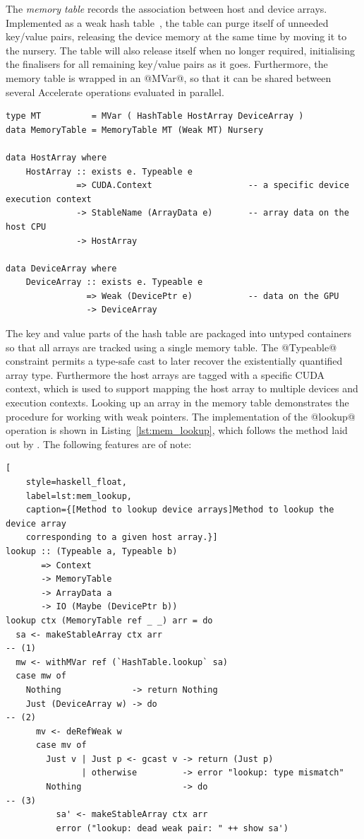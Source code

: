 The \emph{memory table} records the association between host and device arrays.
Implemented as a weak hash table~\cite{PeytonJones:2000ks}, the table can purge
itself of unneeded key/value pairs, releasing the device memory at the same time
by moving it to the nursery. The table will also release itself when no longer
required, initialising the finalisers for all remaining key/value pairs as it
goes. Furthermore, the memory table is wrapped in an @MVar@, so that it can
be shared between several Accelerate operations evaluated in parallel.
%
\begin{lstlisting}[style=haskell]
type MT          = MVar ( HashTable HostArray DeviceArray )
data MemoryTable = MemoryTable MT (Weak MT) Nursery

data HostArray where
    HostArray :: exists e. Typeable e
              => CUDA.Context                   -- a specific device execution context
              -> StableName (ArrayData e)       -- array data on the host CPU
              -> HostArray

data DeviceArray where
    DeviceArray :: exists e. Typeable e
                => Weak (DevicePtr e)           -- data on the GPU
                -> DeviceArray
\end{lstlisting}
%
The key and value parts of the hash table are packaged into untyped containers
so that all arrays are tracked using a single memory table. The @Typeable@
constraint permits a type-safe cast to later recover the existentially
quantified array type. Furthermore the host arrays are tagged with a specific
CUDA context, which is used to support mapping the host array to multiple
devices and execution contexts. Looking up an array in the memory table
demonstrates the procedure for working with weak pointers. The implementation of
the @lookup@ operation is shown in Listing~\ref{lst:mem_lookup}, which follows
the method laid out by \citet{PeytonJones:2000ks}. The following features are of
note:
%
\begin{lstlisting}[
    style=haskell_float,
    label=lst:mem_lookup,
    caption={[Method to lookup device arrays]Method to lookup the device array
    corresponding to a given host array.}]
lookup :: (Typeable a, Typeable b)
       => Context
       -> MemoryTable
       -> ArrayData a
       -> IO (Maybe (DevicePtr b))
lookup ctx (MemoryTable ref _ _) arr = do
  sa <- makeStableArray ctx arr                                                        -- (1)
  mw <- withMVar ref (`HashTable.lookup` sa)
  case mw of
    Nothing              -> return Nothing
    Just (DeviceArray w) -> do                                                         -- (2)
      mv <- deRefWeak w
      case mv of
        Just v | Just p <- gcast v -> return (Just p)
               | otherwise         -> error "lookup: type mismatch"
        Nothing                    -> do                                               -- (3)
          sa' <- makeStableArray ctx arr
          error ("lookup: dead weak pair: " ++ show sa')
\end{lstlisting}
